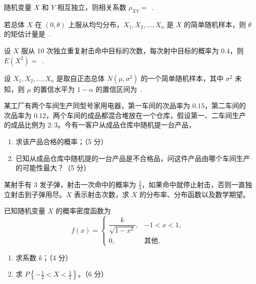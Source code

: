 \documentclass{../template/cqutest}
\begin{document}
\begin{examquestions}[resume]
  \item 随机变量 $X$ 和 $Y$ 相互独立，则相关系数 $\rho_{XY}=$\ \answer[25mm]{}.
  \item 若总体 $X$ 在 $(0,\theta)$ 上服从均匀分布，$X_1,X_2,\ldots,X_n$ 是 $X$ 的简单随机样本，则 $\theta$ 的矩估计量是\ \answer[32mm]{}.
  \item 设 $X$ 服从 10 次独立重复射击命中目标的次数，每次射中目标的概率为 $0.4$，则 $E(X^2)=$\ \answer[25mm]{}.
  \item 设 $X_1,X_2,\ldots,X_n$ 是取自正态总体 $N(\mu,\sigma^2)$ 的一个简单随机样本，其中 $\sigma^2$ 未知，则 $\mu$ 的置信水平为 $1-\alpha$ 的置信区间为\ \answer[36mm]{}.
\end{examquestions}

\begin{examquestions}[resume]
  \item 某工厂有两个车间生产同型号家用电器，第一车间的次品率为 $0.15$，第二车间的次品率为 $0.12$，两个车间的成品都混合堆放在一个仓库，假设第一、二车间生产的成品比例为 $2:3$。今有一客户从成品仓库中随机提一台产品，
  \begin{enumerate}[label=（\arabic*）,leftmargin=2em,itemsep=1mm]
    \item 求该产品合格的概率；（5 分）
    \item 已知从成品仓库中随机提的一台产品是不合格品，问这件产品由哪个车间生产的可能性最大？（5 分）
  \end{enumerate}

  \item 某射手有 3 发子弹，射击一次命中的概率为 $\frac23$，如果命中就停止射击，否则一直独立射击到子弹用尽。$X$ 表示射击次数，求 $X$ 的分布率、分布函数以及数学期望。

  \item 已知随机变量 $X$ 的概率密度函数为
  \[
    f(x)=\begin{cases}\dfrac{k}{\sqrt{1-x^2}},&-1<x<1,\\0,&\text{其他},\end{cases}
  \]
  \begin{enumerate}[label=（\arabic*）,leftmargin=2em,itemsep=1mm]
    \item 求系数 $k$；（4 分）
    \item 求 $P\left\{-\frac12<X<\frac12\right\}$。（6 分）
  \end{enumerate}
\end{examquestions}
\end{document}
